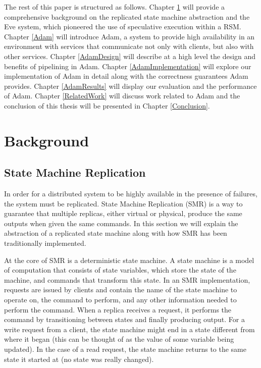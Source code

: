 \documentclass[11pt, oneside]{report}
\begin{document}
The rest of this paper is structured as follows. 
Chapter \ref{Background} will provide a comprehensive background on the replicated state machine abstraction and the Eve system, which pioneered the use of speculative execution within a RSM. 
Chapter \ref{Adam} will introduce Adam, a system to provide high availability in an environment with services that communicate not only with clients, but also with other services. 
Chapter \ref{AdamDesign} will describe at a high level the design and benefits of pipelining in Adam. 
Chapter \ref{AdamImplementation} will explore our implementation of Adam in detail along with the correctness guarantees Adam provides. 
Chapter \ref{AdamResults} will display our evaluation and the performance of Adam. 
Chapter \ref{RelatedWork} will discuss work related to Adam and the conclusion of this thesis will be presented in Chapter \ref{Conclusion}.

\chapter{Background}\label{Background}
\section{State Machine Replication}
In order for a distributed system to be highly available in the presence of failures, the system must be replicated. 
State Machine Replication (SMR) is a way to guarantee that multiple replicas, either virtual or physical, produce the same outputs when given the same commands. 
In this section we will explain the abstraction of a replicated state machine along with how SMR has been traditionally implemented.

At the core of SMR is a deterministic state machine. 
A state machine is a model of computation that consists of state variables, which store the state of the machine, and commands that transform this state. 
In an SMR implementation, requests are issued by clients and contain the name of the state machine to operate on, the command to perform, and any other information needed to perform the command. 
When a replica receives a request, it performs the command by transitioning between states and finally producing output. 
For a write request from a client, the state machine might end in a state different from where it began (this can be thought of as the value of some variable being updated). 
In the case of a read request, the state machine returns to the same state it started at (no state was really changed).
\end{document}
